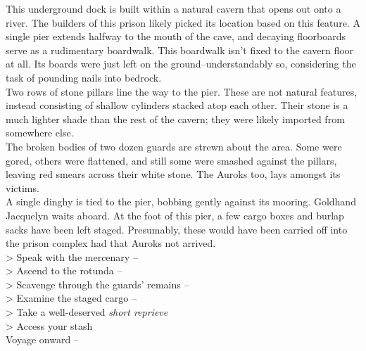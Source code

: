 This underground dock is built within a natural cavern that opens out onto a river. The builders of this prison likely picked its location based on this feature. A single pier extends halfway to the mouth of the cave, and decaying floorboards serve as a rudimentary boardwalk. This boardwalk isn’t fixed to the cavern floor at all. Its boards were just left on the ground--understandably so, considering the task of pounding nails into bedrock.\\

Two rows of stone pillars line the way to the pier. These are not natural features, instead consisting of shallow cylinders stacked atop each other. Their stone is a much lighter shade than the rest of the cavern; they were likely imported from somewhere else.\\

The broken bodies of two dozen guards are strewn about the area. Some were gored, others were flattened, and still some were smashed against the pillars, leaving red smears across their white stone. The Auroks too, lays amongst its victims.\\

A single dinghy is tied to the pier, bobbing gently against its mooring. Goldhand Jacquelyn waits aboard. At the foot of this pier, a few cargo boxes and burlap sacks have been left staged. Presumably, these would have been carried off into the prison complex had that Auroks not arrived.\\

> Speak with the mercenary -- \\
> Ascend to the rotunda -- \\
> Scavenge through the guards’ remains -- \\
> Examine the staged cargo -- \\
> Take a well-deserved \emph{short reprieve}\\
> Access your stash\\
 Voyage onward -- 